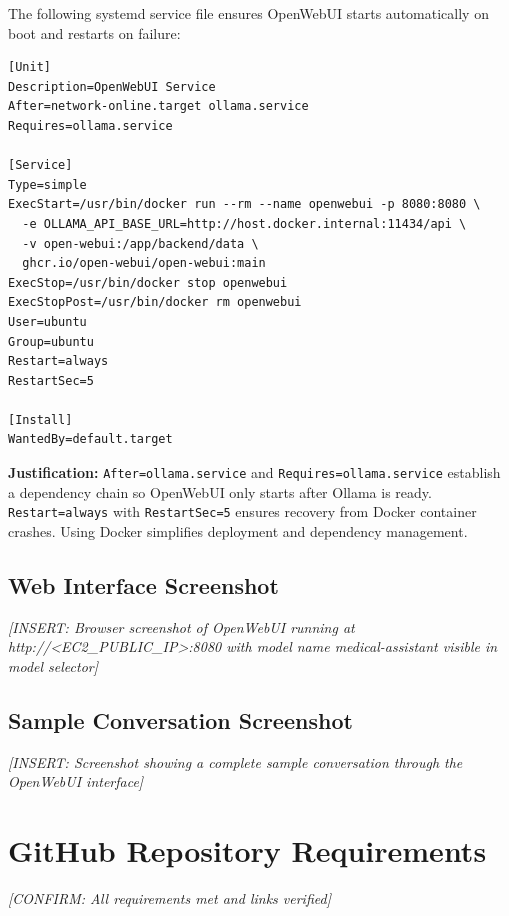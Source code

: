 \documentclass[11pt,a4paper]{article}
\begin{document}
The following systemd service file ensures OpenWebUI starts automatically on boot and restarts on failure:

\begin{lstlisting}[style=ini]
[Unit]
Description=OpenWebUI Service
After=network-online.target ollama.service
Requires=ollama.service

[Service]
Type=simple
ExecStart=/usr/bin/docker run --rm --name openwebui -p 8080:8080 \
  -e OLLAMA_API_BASE_URL=http://host.docker.internal:11434/api \
  -v open-webui:/app/backend/data \
  ghcr.io/open-webui/open-webui:main
ExecStop=/usr/bin/docker stop openwebui
ExecStopPost=/usr/bin/docker rm openwebui
User=ubuntu
Group=ubuntu
Restart=always
RestartSec=5

[Install]
WantedBy=default.target
\end{lstlisting}

\textbf{Justification:} \texttt{After=ollama.service} and \texttt{Requires=ollama.service} establish a dependency chain so OpenWebUI only starts after Ollama is ready. \texttt{Restart=always} with \texttt{RestartSec=5} ensures recovery from Docker container crashes. Using Docker simplifies deployment and dependency management.

\subsection{Web Interface Screenshot}

\textit{[INSERT: Browser screenshot of OpenWebUI running at http://<EC2\_PUBLIC\_IP>:8080 with model name medical-assistant visible in model selector]}

\subsection{Sample Conversation Screenshot}

\textit{[INSERT: Screenshot showing a complete sample conversation through the OpenWebUI interface]}

\section{GitHub Repository Requirements}

\textit{[CONFIRM: All requirements met and links verified]}
\end{document}
